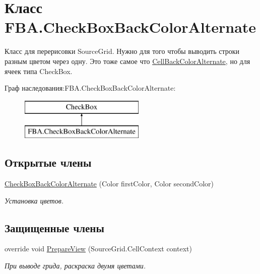 \hypertarget{class_f_b_a_1_1_check_box_back_color_alternate}{}\section{Класс F\+B\+A.\+Check\+Box\+Back\+Color\+Alternate}
\label{class_f_b_a_1_1_check_box_back_color_alternate}


Класс для перерисовки Source\+Grid. Нужно для того чтобы выводить строки разным цветом через одну. Это тоже самое что \mbox{\hyperlink{class_f_b_a_1_1_cell_back_color_alternate}{Cell\+Back\+Color\+Alternate}}, но для ячеек типа Check\+Box.  


Граф наследования\+:F\+B\+A.\+Check\+Box\+Back\+Color\+Alternate\+:\begin{figure}[H]
\begin{center}
\leavevmode
\includegraphics[height=2.000000cm]{class_f_b_a_1_1_check_box_back_color_alternate}
\end{center}
\end{figure}
\subsection*{Открытые члены}
\begin{DoxyCompactItemize}
\item 
\mbox{\hyperlink{class_f_b_a_1_1_check_box_back_color_alternate_a3c5dbb6578257fb63b2193bad6126e7b}{Check\+Box\+Back\+Color\+Alternate}} (Color first\+Color, Color second\+Color)
\begin{DoxyCompactList}\small\item\em Установка цветов. \end{DoxyCompactList}\end{DoxyCompactItemize}
\subsection*{Защищенные члены}
\begin{DoxyCompactItemize}
\item 
override void \mbox{\hyperlink{class_f_b_a_1_1_check_box_back_color_alternate_a424a015529c6046edf103f8e01f3b285}{Prepare\+View}} (Source\+Grid.\+Cell\+Context context)
\begin{DoxyCompactList}\small\item\em При выводе грида, раскраска двумя цветами. \end{DoxyCompactList}\end{DoxyCompactItemize}
